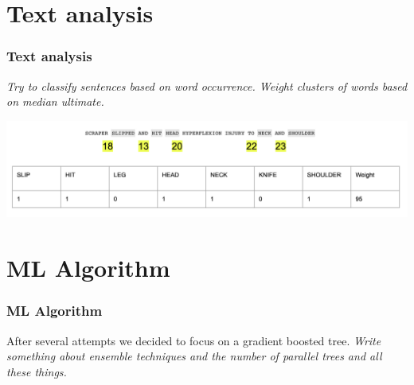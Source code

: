 \documentclass{beamer}
\begin{document}

\section{Text analysis}
\begin{frame}
\frametitle{Text analysis}
\emph{Try to classify sentences based on word occurrence. Weight clusters of words based on median ultimate.}


\includegraphics[width=\textwidth]{./images/claimdescription.png}
\end{frame}


\section{ML Algorithm}
\begin{frame}
\frametitle{ML Algorithm}
After several attempts we decided to focus on a gradient boosted tree. \emph{Write something about ensemble techniques and the number of parallel trees and all these things.}
\end{frame}

\end{document}
